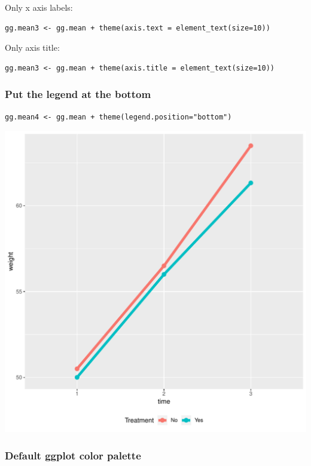 \documentclass{article}
\begin{document}
Only x axis labels:
\lstset{language=r,label= ,caption= ,captionpos=b,numbers=none}
\begin{lstlisting}
gg.mean3 <- gg.mean + theme(axis.text = element_text(size=10))
\end{lstlisting}

Only axis title:
\lstset{language=r,label= ,caption= ,captionpos=b,numbers=none}
\begin{lstlisting}
gg.mean3 <- gg.mean + theme(axis.title = element_text(size=10))
\end{lstlisting}

\clearpage
\subsubsection{Put the legend at the bottom}
\label{sec:orgf3dad56}
\lstset{language=r,label= ,caption= ,captionpos=b,numbers=none}
\begin{lstlisting}
gg.mean4 <- gg.mean + theme(legend.position="bottom")
\end{lstlisting}

\begin{center}
\includegraphics[width=.9\linewidth]{./figures/fig-meanTime4.pdf}
\end{center}
\clearpage
\subsubsection{Default ggplot color palette}
\label{sec:org4fd0301}
\end{document}
